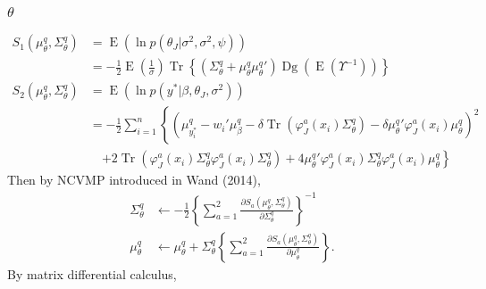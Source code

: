 \documentclass[11pt]{article}
\DeclareMathOperator{\Tr}{Tr}
\newcommand{\opn}{\operatorname}
\begin{document}
\subsubsection{$\theta$}
  \begin{align*}
    S_{1}\left(\mu_{\theta}^{q}, \Sigma_{\theta}^{q}\right) &= \opn{E}\left(\ln p\left(\theta_{J}|\sigma^{2}, \sigma^{2}, \psi\right)\right)\\
    &= -\frac{1}{2}\opn{E}\left(\frac{1}{\sigma}\right)\Tr\left\{\left(\Sigma_{\theta}^{q}+\mu_{\theta}^{q}{\mu_{\theta}^{q}}'\right)\opn{Dg}\left(\opn{E}\left(\Upsilon^{-1}\right)\right) \right\}\\
    S_{2}\left(\mu_{\theta}^{q},\Sigma_{\theta}^{q}\right) &= \opn{E}\left(\ln p\left(y^{*}|\beta, \theta_{J}, \sigma^{2}\right)\right)\\
    &= -\frac{1}{2}\sum_{i=1}^{n}\left\{\left(\mu_{y_{i}^{*}}^{q} -w_{i}'\mu_{\beta}^{q}-\delta\Tr\left(\varphi_{J}^{a}\left(x_{i}\right)\Sigma_{\theta}^{q}\right)-\delta{\mu_{\theta}^{q}}'\varphi_{J}^{a}\left(x_{i}\right)\mu_{\theta}^{q}\right)^{2} \right.\\
    &\quad \left. +2\Tr\left(\varphi_{J}^{a}\left(x_{i}\right)\Sigma_{\theta}^{q}\varphi_{J}^{a}\left(x_{i}\right)\Sigma_{\theta}^{q}\right) +4{\mu_{\theta}^{q}}'\varphi_{J}^{a}\left(x_{i}\right)\Sigma_{\theta}^{q}\varphi_{J}^{a}\left(x_{i}\right)\mu_{\theta}^{q}\right\}
  \end{align*}
  Then by NCVMP introduced in Wand (2014),
  \begin{align*}
    \Sigma_{\theta}^{q} &\leftarrow -\frac{1}{2}\left\{\sum_{a=1}^{2} \frac{\partial S_{a}\left(\mu_{\theta}^{q}, \Sigma_{\theta}^{q}\right)}{\partial \Sigma_{\theta}^{q}} \right\}^{-1}\\
    \mu_{\theta}^{q} &\leftarrow \mu_{\theta}^{q} + \Sigma_{\theta}^{q}\left\{\sum_{a=1}^{2} \frac{\partial S_{a}\left(\mu_{\theta}^{q}, \Sigma_{\theta}^{q}\right)}{\partial \mu_{\theta}^{q}} \right\}.
  \end{align*}
  By matrix differential calculus,
\end{document}

